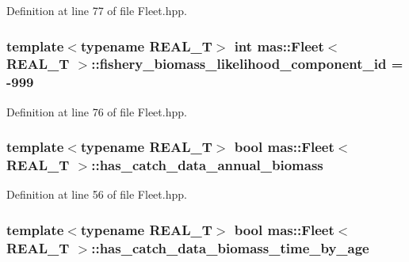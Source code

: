 Definition at line 77 of file Fleet.\-hpp.

\hypertarget{structmas_1_1_fleet_a2f3667e571a5c22538606e4c3156f7b5}{
\subsubsection[{fishery\-\_\-biomass\-\_\-likelihood\-\_\-component\-\_\-id}]{\setlength{\rightskip}{0pt plus 5cm}template$<$typename R\-E\-A\-L\-\_\-\-T$>$ int {\bf mas\-::\-Fleet}$<$ R\-E\-A\-L\-\_\-\-T $>$\-::fishery\-\_\-biomass\-\_\-likelihood\-\_\-component\-\_\-id = -\/999}}\label{structmas_1_1_fleet_a2f3667e571a5c22538606e4c3156f7b5}


Definition at line 76 of file Fleet.\-hpp.

\hypertarget{structmas_1_1_fleet_a983d40b11fbaef98245d435a6420f162}{
\subsubsection[{has\-\_\-catch\-\_\-data\-\_\-annual\-\_\-biomass}]{\setlength{\rightskip}{0pt plus 5cm}template$<$typename R\-E\-A\-L\-\_\-\-T$>$ bool {\bf mas\-::\-Fleet}$<$ R\-E\-A\-L\-\_\-\-T $>$\-::has\-\_\-catch\-\_\-data\-\_\-annual\-\_\-biomass}}\label{structmas_1_1_fleet_a983d40b11fbaef98245d435a6420f162}


Definition at line 56 of file Fleet.\-hpp.

\hypertarget{structmas_1_1_fleet_aab0d326e2e7fb03bcd5a8073b526c255}{
\subsubsection[{has\-\_\-catch\-\_\-data\-\_\-biomass\-\_\-time\-\_\-by\-\_\-age}]{\setlength{\rightskip}{0pt plus 5cm}template$<$typename R\-E\-A\-L\-\_\-\-T$>$ bool {\bf mas\-::\-Fleet}$<$ R\-E\-A\-L\-\_\-\-T $>$\-::has\-\_\-catch\-\_\-data\-\_\-biomass\-\_\-time\-\_\-by\-\_\-age}}\label{structmas_1_1_fleet_aab0d326e2e7fb03bcd5a8073b526c255}


